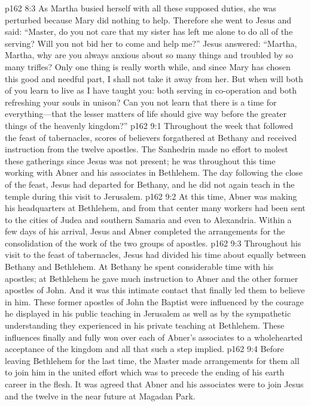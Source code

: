 \vs p162 8:3 As Martha busied herself with all these supposed duties, she was perturbed because Mary did nothing to help. Therefore she went to Jesus and said: “Master, do you not care that my sister has left me alone to do all of the serving? Will you not bid her to come and help me?” Jesus answered: \textcolor{ubdarkred}{“Martha, Martha, why are you always anxious about so many things and troubled by so many trifles? Only one thing is really worth while, and since Mary has chosen this good and needful part, I shall not take it away from her. But when will both of you learn to live as I have taught you: both serving in co\hyp{}operation and both refreshing your souls in unison? Can you not learn that there is a time for everything---that the lesser matters of life should give way before the greater things of the heavenly kingdom?”}\plusone
{}
\vs p162 9:1 Throughout the week that followed the feast of tabernacles, scores of believers forgathered at Bethany and received instruction from the twelve apostles. The Sanhedrin made no effort to molest these gatherings since Jesus was not present; he was throughout this time working with Abner and his associates in Bethlehem. The day following the close of the feast, Jesus had departed for Bethany, and he did not again teach in the temple during this visit to Jerusalem.
\pc \vs p162 9:2 At this time, Abner was making his headquarters at Bethlehem, and from that center many workers had been sent to the cities of Judea and southern Samaria and even to Alexandria. Within a few days of his arrival, Jesus and Abner completed the arrangements for the consolidation of the work of the two groups of apostles.
\vs p162 9:3 Throughout his visit to the feast of tabernacles, Jesus had divided his time about equally between Bethany and Bethlehem. At Bethany he spent considerable time with his apostles; at Bethlehem he gave much instruction to Abner and the other former apostles of John. And it was this intimate contact that finally led them to believe in him. These former apostles of John the Baptist were influenced by the courage he displayed in his public teaching in Jerusalem as well as by the sympathetic understanding they experienced in his private teaching at Bethlehem. These influences finally and fully won over each of Abner’s associates to a wholehearted acceptance of the kingdom and all that such a step implied.
\pc \vs p162 9:4 Before leaving Bethlehem for the last time, the Master made arrangements for them all to join him in the united effort which was to precede the ending of his earth career in the flesh. It was agreed that Abner and his associates were to join Jesus and the twelve in the near future at Magadan Park.
